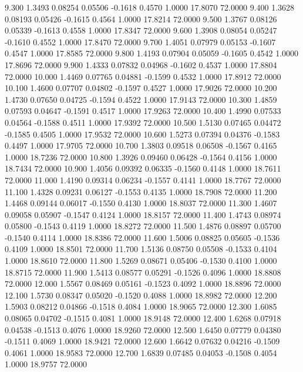    9.300   1.3493   0.08254   0.05506  -0.1618   0.4570   1.0000  17.8070  72.0000
   9.400   1.3628   0.08193   0.05426  -0.1615   0.4564   1.0000  17.8214  72.0000
   9.500   1.3767   0.08126   0.05339  -0.1613   0.4558   1.0000  17.8347  72.0000
   9.600   1.3908   0.08054   0.05247  -0.1610   0.4552   1.0000  17.8470  72.0000
   9.700   1.4051   0.07979   0.05153  -0.1607   0.4547   1.0000  17.8585  72.0000
   9.800   1.4193   0.07904   0.05059  -0.1605   0.4542   1.0000  17.8696  72.0000
   9.900   1.4333   0.07832   0.04968  -0.1602   0.4537   1.0000  17.8804  72.0000
  10.000   1.4469   0.07765   0.04881  -0.1599   0.4532   1.0000  17.8912  72.0000
  10.100   1.4600   0.07707   0.04802  -0.1597   0.4527   1.0000  17.9026  72.0000
  10.200   1.4730   0.07650   0.04725  -0.1594   0.4522   1.0000  17.9143  72.0000
  10.300   1.4859   0.07593   0.04647  -0.1591   0.4517   1.0000  17.9263  72.0000
  10.400   1.4990   0.07533   0.04564  -0.1588   0.4511   1.0000  17.9392  72.0000
  10.500   1.5130   0.07465   0.04472  -0.1585   0.4505   1.0000  17.9532  72.0000
  10.600   1.5273   0.07394   0.04376  -0.1583   0.4497   1.0000  17.9705  72.0000
  10.700   1.3803   0.09518   0.06508  -0.1567   0.4165   1.0000  18.7236  72.0000
  10.800   1.3926   0.09460   0.06428  -0.1564   0.4156   1.0000  18.7434  72.0000
  10.900   1.4056   0.09392   0.06335  -0.1560   0.4148   1.0000  18.7611  72.0000
  11.000   1.4190   0.09314   0.06234  -0.1557   0.4141   1.0000  18.7767  72.0000
  11.100   1.4328   0.09231   0.06127  -0.1553   0.4135   1.0000  18.7908  72.0000
  11.200   1.4468   0.09144   0.06017  -0.1550   0.4130   1.0000  18.8037  72.0000
  11.300   1.4607   0.09058   0.05907  -0.1547   0.4124   1.0000  18.8157  72.0000
  11.400   1.4743   0.08974   0.05800  -0.1543   0.4119   1.0000  18.8272  72.0000
  11.500   1.4876   0.08897   0.05700  -0.1540   0.4114   1.0000  18.8386  72.0000
  11.600   1.5006   0.08825   0.05605  -0.1536   0.4109   1.0000  18.8501  72.0000
  11.700   1.5136   0.08750   0.05508  -0.1533   0.4104   1.0000  18.8610  72.0000
  11.800   1.5269   0.08671   0.05406  -0.1530   0.4100   1.0000  18.8715  72.0000
  11.900   1.5413   0.08577   0.05291  -0.1526   0.4096   1.0000  18.8808  72.0000
  12.000   1.5567   0.08469   0.05161  -0.1523   0.4092   1.0000  18.8896  72.0000
  12.100   1.5730   0.08347   0.05020  -0.1520   0.4088   1.0000  18.8982  72.0000
  12.200   1.5903   0.08212   0.04866  -0.1518   0.4084   1.0000  18.9065  72.0000
  12.300   1.6085   0.08065   0.04702  -0.1515   0.4081   1.0000  18.9148  72.0000
  12.400   1.6268   0.07918   0.04538  -0.1513   0.4076   1.0000  18.9260  72.0000
  12.500   1.6450   0.07779   0.04380  -0.1511   0.4069   1.0000  18.9421  72.0000
  12.600   1.6642   0.07632   0.04216  -0.1509   0.4061   1.0000  18.9583  72.0000
  12.700   1.6839   0.07485   0.04053  -0.1508   0.4054   1.0000  18.9757  72.0000
